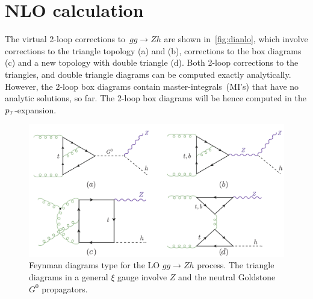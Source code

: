 \section{ NLO calculation }
\label{sec:quattro}
The virtual 2-loop corrections to~$ gg\to Zh$ are shown in~\autoref{fig:dianlo}, which involve corrections to the triangle topology (a) and (b), corrections to the box diagrams (c) and a new topology with double triangle (d). Both 2-loop corrections to the triangles, and double triangle diagrams can be computed exactly analytically. However, the 2-loop box diagrams contain master-integrals~(MI's) that have no analytic solutions, so far. The 2-loop box diagrams will be hence computed in the $p_{\scriptscriptstyle T}$-expansion.
\begin{figure}[htpb!]
	\begin{center}
		\includegraphics[width=12cm]{./figures/Feynman_NL0}
		\caption{Feynman diagrams type for the LO $gg \to Zh$ process. The triangle diagrams in a general $\xi$ gauge involve $Z$ and the neutral Goldstone~$G^0$ propagators. }
		\label{fig:dianlo}
	\end{center}
\end{figure}
